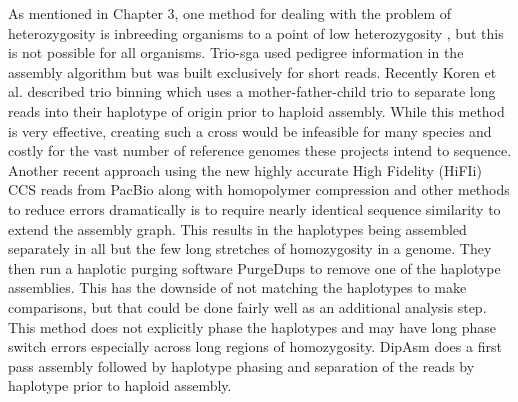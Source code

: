 \par{
As mentioned in Chapter 3, one method for dealing with the problem of heterozygosity is inbreeding organisms to a point of low heterozygosity \cite{drosophila}, 
but this is not possible for all organisms. Trio-sga used pedigree information in the assembly algorithm \cite{trio-sga} 
but was built exclusively for short reads. Recently Koren et al. described trio binning which uses a mother-father-child trio to 
separate long reads into their haplotype of origin prior to haploid assembly\cite{triobinning}. 
While this method is very effective, creating such a cross would be infeasible for many species and costly for the vast number of reference genomes these projects intend to sequence. 
Another recent approach using the new highly accurate High Fidelity (HiFIi) CCS reads from PacBio along with homopolymer compression and other methods to reduce errors dramatically is to 
require nearly identical sequence similarity to extend the assembly graph\cite{HICANU}. This results in the haplotypes being assembled separately in all but the few long stretches of homozygosity in 
a genome. They then run a haplotic purging software PurgeDups\cite{purgedups} to remove one of the haplotype assemblies. This has the downside of not matching the haplotypes to make comparisons, but that could be done 
fairly well as an additional analysis step. This method does not explicitly phase the haplotypes and may have long phase switch errors especially across long regions of homozygosity. DipAsm does a first pass assembly followed by haplotype phasing and separation of the reads by haplotype prior to haploid assembly\cite{Garg2021}.
} 

